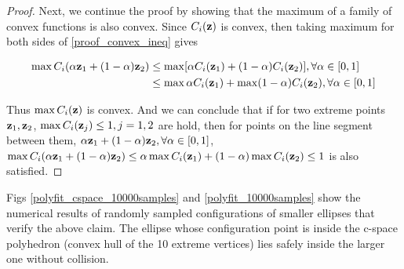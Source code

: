\documentclass{article}
\begin{document}
\begin{enumerate}
\begin{enumerate}
\begin{proof}
Next, we continue the proof by showing that the maximum of a family of convex functions is also convex. Since $C_i({\bf z})$ is convex, then taking maximum for both sides of \eqref{proof_convex_ineq} gives

\begin{equation}
\begin{aligned}
\max C_i(\alpha {\bf z}_1 + (1-\alpha) {\bf z}_2) &\leq \max [\alpha C_i({\bf z}_1) + (1-\alpha) C_i({\bf z}_2)],  \forall  \alpha \in [0,1]\\
&\leq \max \alpha C_i({\bf z}_1) + \max (1-\alpha) C_i({\bf z}_2),  \forall  \alpha \in [0,1] \\
\end{aligned}
\end{equation}

Thus $\max C_i({\bf z})$ is convex. And we can conclude that if for two extreme points ${\bf z}_1, {\bf z}_2$, $\max C_i({\bf z}_j) \leq 1, j=1,2$ are hold, then for points on the line segment between them, $\alpha {\bf z}_1 + (1-\alpha) {\bf z}_2, \forall \alpha \in [0,1]$, $\max C_i(\alpha {\bf z}_1 + (1-\alpha) {\bf z}_2) \leq \alpha \max C_i({\bf z}_1) + (1-\alpha) \max C_i({\bf z}_2) \leq 1$ is also satisfied. 
\end{proof}

Figs \ref{polyfit_cspace_10000samples} and \ref{polyfit_10000samples} show the numerical results of randomly sampled configurations of smaller ellipses that verify the above claim. The ellipse whose configuration point is inside the c-space polyhedron (convex hull of the 10 extreme vertices) lies safely inside the larger one without collision.


\end{enumerate}
\end{enumerate}
\end{document}
